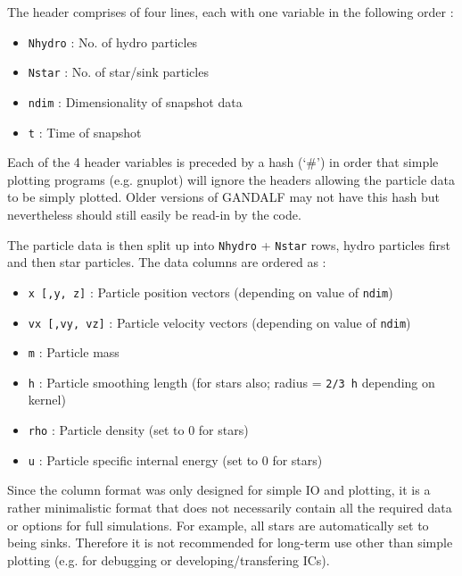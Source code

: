 \documentclass[a4paper]{article}
\newcommand{\var}[1]{\texttt{#1}}
\begin{document}
The header comprises of four lines, each with one variable in the following order : 
\begin{itemize}
\item \var{Nhydro} : No. of hydro particles
\item \var{Nstar}  : No. of star/sink particles
\item \var{ndim}   : Dimensionality of snapshot data
\item \var{t}      : Time of snapshot
\end{itemize}
Each of the 4 header variables is preceded by a hash (`\#') in order that simple plotting programs (e.g. gnuplot) will ignore the headers allowing the particle data to be simply plotted.  Older versions of GANDALF may not have this hash but nevertheless should still easily be read-in by the code.

The particle data is then split up into \var{Nhydro} + \var{Nstar} rows, hydro particles first and then star particles.  The data columns are ordered as : 
\begin{itemize}
\item \var{x [,y, z]} : Particle position vectors (depending on value of \var{ndim})
\item \var{vx [,vy, vz]} : Particle velocity vectors (depending on value of \var{ndim})
\item \var{m} : Particle mass
\item \var{h} : Particle smoothing length (for stars also; radius = \var{2/3\,h} depending on kernel)
\item \var{rho} : Particle density (set to 0 for stars)
\item \var{u} : Particle specific internal energy (set to 0 for stars)
\end{itemize}
Since the column format was only designed for simple IO and plotting, it is a rather minimalistic format that does not necessarily contain all the required data or options for full simulations.  For example, all stars are automatically set to being sinks.  Therefore it is not recommended for long-term use other than simple plotting (e.g. for debugging or developing/transfering ICs).  



\end{document}
